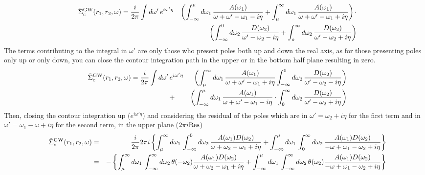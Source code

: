 \documentclass[fleqn]{article}
\begin{document}
\begin{eqnarray*}
  \quad
  \tilde{\Sigma}^{\rm GW}_c(r_1,r_2,\omega) =
  \frac{i}{2 \pi} \int d\omega' \, & e^{i \omega' \eta} & \left(
    \int_{-\infty}^\mu d\omega_1 \, \frac{A(\omega_1)}{\omega+\omega'-\omega_1-i\eta} +
    \int_\mu^\infty d\omega_1 \, \frac{A(\omega_1)}{\omega+\omega'-\omega_1+i\eta} \right) \cdot
    \\ &&
    \left( \int_{-\infty}^0 d\omega_2 \, \frac{D(\omega_2)}{\omega'-\omega_2-i\eta} +
    \int_o^\infty d\omega_2 \, \frac{D(\omega_2)}{\omega'-\omega_2+i\eta} \right)
\end{eqnarray*}
The terms contributing to the integral in $\omega'$ are only those who present
poles both up and down the real axis, as for those presenting poles only up or only
down, you can close the contour integration path in the upper or in the bottom half plane
resulting in zero.
\begin{eqnarray*}
  \quad
  \tilde{\Sigma}^{\rm GW}_c(r_1,r_2,\omega) =
  \frac{i}{2 \pi} \int d\omega' \, & e^{i \omega' \eta} &
    \left( \int_\mu^\infty d\omega_1 \, \frac{A(\omega_1)}{\omega+\omega'-\omega_1+i\eta}
    \int_{-\infty}^0 d\omega_2 \, \frac{D(\omega_2)}{\omega'-\omega_2-i\eta} \right)
    \\ &+&
    \left( \int_{-\infty}^\mu d\omega_1 \, \frac{A(\omega_1)}{\omega+\omega'-\omega_1-i\eta} \cdot
     \int_0^\infty d\omega_2 \, \frac{D(\omega_2)}{\omega'-\omega_2+i\eta} \right)
\end{eqnarray*}
Then, closing the contour integration up ($e^{i \omega' \eta}$)
and considering the residual of the
poles which are in $\omega' = \omega_2 + i \eta$ for the first term
and in $\omega' = \omega_1 - \omega + i \eta$ for the second term,
in the upper plane ($2\pi i {\rm Res}$)
\begin{eqnarray*}
  \quad
  \tilde{\Sigma}^{\rm GW}_c(r_1,r_2,\omega) &=& \frac{i}{2 \pi} 2 \pi i \left\{
  \int^{\infty}_\mu d\omega_1 \, \int_{-\infty}^0 d\omega_2 \,
  \frac{A(\omega_1)D(\omega_2)}{\omega+\omega_2-\omega_1+i\eta} +
  \int^\mu_{-\infty} d\omega_1 \, \int_0^\infty d\omega_2 \,
  \frac{A(\omega_1)D(\omega_2)}{-\omega+\omega_1-\omega_2+i\eta} \right\}
  \\ &=&
  - \left\{
  \int^{\infty}_{\mu} d\omega_1 \, \int_{-\infty}^\infty d\omega_2 \, \theta(-\omega_2)
  \frac{A(\omega_1)D(\omega_2)}{\omega+\omega_2-\omega_1+i\eta} +
  \int^\mu_{-\infty} d\omega_1 \, \int_{-\infty}^\infty d\omega_2 \, \theta(\omega_2)
  \frac{A(\omega_1)D(\omega_2)}{-\omega+\omega_1-\omega_2+i\eta} \right\}
\end{eqnarray*}
\end{document}
